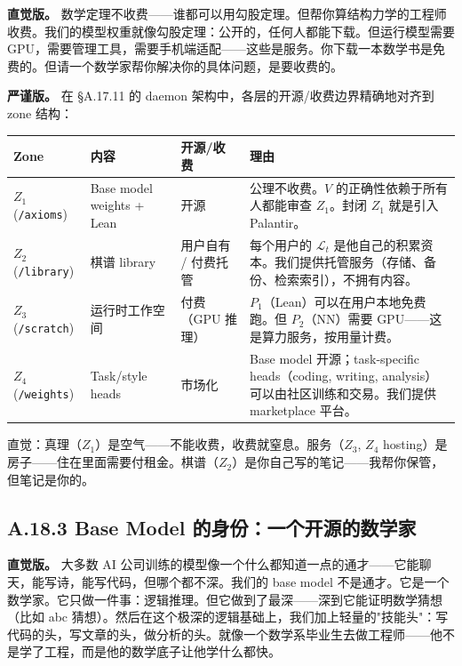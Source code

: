 \documentclass[11pt,a4paper]{article}
\theoremstyle{definition}
\theoremstyle{remark}
\begin{document}
\textbf{直觉版。}
数学定理不收费——谁都可以用勾股定理。但帮你算结构力学的工程师收费。我们的模型权重就像勾股定理：公开的，任何人都能下载。但运行模型需要 GPU，需要管理工具，需要手机端适配——这些是服务。你下载一本数学书是免费的。但请一个数学家帮你解决你的具体问题，是要收费的。

\textbf{严谨版。}
在 \S A.17.11 的 daemon 架构中，各层的开源/收费边界精确地对齐到 zone 结构：

\begin{center}
\small
\begin{tabularx}{\textwidth}{l l l X}
\toprule
\textbf{Zone} & \textbf{内容} & \textbf{开源/收费} & \textbf{理由} \\
\midrule
$Z_1$ (\texttt{/axioms}) & Base model weights + Lean & 开源 & 公理不收费。$V$ 的正确性依赖于所有人都能审查 $Z_1$。封闭 $Z_1$ 就是引入 Palantir。 \\
$Z_2$ (\texttt{/library}) & 棋谱 library & 用户自有 / 付费托管 & 每个用户的 $\mathcal{L}_t$ 是他自己的积累资本。我们提供托管服务（存储、备份、检索索引），不拥有内容。 \\
$Z_3$ (\texttt{/scratch}) & 运行时工作空间 & 付费（GPU 推理） & $P_1$（Lean）可以在用户本地免费跑。但 $P_2$（NN）需要 GPU——这是算力服务，按用量计费。 \\
$Z_4$ (\texttt{/weights}) & Task/style heads & 市场化 & Base model 开源；task-specific heads（coding, writing, analysis）可以由社区训练和交易。我们提供 marketplace 平台。 \\
\bottomrule
\end{tabularx}
\end{center}

\noindent 直觉：真理（$Z_1$）是空气——不能收费，收费就窒息。服务（$Z_3$, $Z_4$ hosting）是房子——住在里面需要付租金。棋谱（$Z_2$）是你自己写的笔记——我帮你保管，但笔记是你的。


\subsection{A.18.3 Base Model 的身份：一个开源的数学家}

\textbf{直觉版。}
大多数 AI 公司训练的模型像一个什么都知道一点的通才——它能聊天，能写诗，能写代码，但哪个都不深。我们的 base model 不是通才。它是一个数学家。它只做一件事：逻辑推理。但它做到了最深——深到它能证明数学猜想（比如 abc 猜想）。然后在这个极深的逻辑基础上，我们加上轻量的"技能头"：写代码的头，写文章的头，做分析的头。就像一个数学系毕业生去做工程师——他不是学了工程，而是他的数学底子让他学什么都快。
\end{document}
